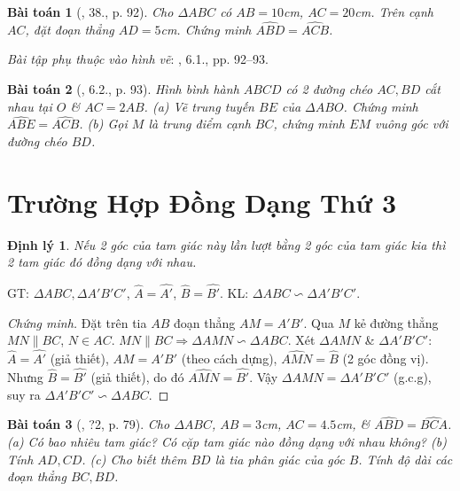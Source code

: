 \documentclass{article}
\newtheorem{baitoan}{Bài toán}
\newtheorem{dinhly}{Định lý}
\begin{document}
\begin{baitoan}[\cite{SBT_Toan_8_tap_2}, 38., p. 92]
	Cho $\Delta ABC$ có $AB = 10$\emph{cm}, $AC = 20$\emph{cm}. Trên cạnh $AC$, đặt đoạn thẳng $AD = 5$\emph{cm}. Chứng minh $\widehat{ABD} = \widehat{ACB}$.
\end{baitoan}
\noindent\textit{Bài tập phụ thuộc vào hình vẽ}: \cite{SBT_Toan_8_tap_2}, 6.1., pp. 92--93.

\begin{baitoan}[\cite{SBT_Toan_8_tap_2}, 6.2., p. 93]
	Hình bình hành $ABCD$ có 2 đường chéo $AC,BD$ cắt nhau tại $O$ \& $AC = 2AB$. (a) Vẽ trung tuyến $BE$ của $\Delta ABO$. Chứng minh $\widehat{ABE} = \widehat{ACB}$. (b) Gọi $M$ là trung điểm cạnh $BC$, chứng minh $EM$ vuông góc với đường chéo $BD$.
\end{baitoan}


\section{Trường Hợp Đồng Dạng Thứ 3}

\begin{dinhly}
	Nếu 2 góc của tam giác này lần lượt bằng 2 góc của tam giác kia thì 2 tam giác đó đồng dạng với nhau.
\end{dinhly}
GT: $\Delta ABC,\Delta A'B'C'$, $\widehat{A} = \widehat{A'}$, $\widehat{B} = \widehat{B'}$. KL: $\Delta ABC\backsim\Delta A'B'C'$.

\begin{proof}[Chứng minh]
	Đặt trên tia $AB$ đoạn thẳng $AM = A'B'$. Qua $M$ kẻ đường thẳng $MN\parallel BC$, $N\in AC$. $MN\parallel BC\Rightarrow\Delta AMN\backsim\Delta ABC$. Xét $\Delta AMN$ \& $\Delta A'B'C'$: $\widehat{A} = \widehat{A'}$ (giả thiết), $AM = A'B'$ (theo cách dựng), $\widehat{AMN} = \widehat{B}$ (2 góc đồng vị). Nhưng $\widehat{B} = \widehat{B'}$ (giả thiết), do đó $\widehat{AMN} = \widehat{B'}$. Vậy $\Delta AMN = \Delta A'B'C'$ (g.c.g), suy ra $\Delta A'B'C'\backsim\Delta ABC$.
\end{proof}

\begin{baitoan}[\cite{SGK_Toan_8_tap_2}, ?2, p. 79]
	Cho $\Delta ABC$, $AB = 3$\emph{cm}, $AC = 4.5$\emph{cm}, \& $\widehat{ABD} = \widehat{BCA}$. (a) Có bao nhiêu tam giác? Có cặp tam giác nào đồng dạng với nhau không? (b) Tính $AD,CD$. (c) Cho biết thêm $BD$ là tia phân giác của góc $B$. Tính độ dài các đoạn thẳng $BC,BD$.
\end{baitoan}
\end{document}
